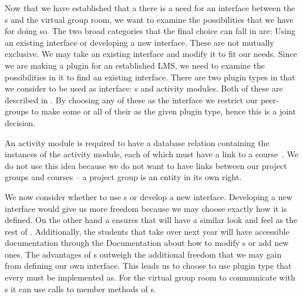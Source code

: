 Now that we have established that a there is a need for an interface between the \detdeandrelaver[]s and the virtual group room, we want to examine the possibilities that we have for doing so.
The two broad categories that the final choice can fall in are: Using an existing interface or developing a new interface.
These are not mutually exclusive.
We may take an existing interface and modify it to fit our needs.
Since we are making a plugin for an established LMS, we need to examine the possibilities in it to find an existing interface.
There are two plugin types in \moodle{} that we consider to be used as interface: \block{}s and activity modules.
Both of these are described in .
By choosing any of these as the interface we restrict our peer-groups to make some or all of their \subsystem{} as the given plugin type, hence this is a joint decision.

An activity module is required to have a database relation containing the instances of the activity module, each of which must have a link to a course~\cite{moodleactivitymodule}.
We do not use this idea because we do not want to have links between our project groups and courses -- a project group is an entity in its own right.

We now consider whether to use \block{}s or develop a new interface.
Developing a new interface would give us more freedom because we may choose exactly how it is defined.
On the other hand a \block{} ensures that \system{} will have a similar look and feel as the rest of \moodle{}.
Additionally, the students that take over next year will have accessible documentation through the \moodle{} Documentation about how to modify \detdeandrelaver[]s or add new ones.
The advantages of \block{}s outweigh the additional freedom that we may gain from defining our own interface.
This leads us to choose to use \block{} plugin type that every \detdeandrelaver{} must be implemented as.
For the virtual group room to communicate with \detdeandrelaver[]s it can use calls to member methods of \block{}s.


